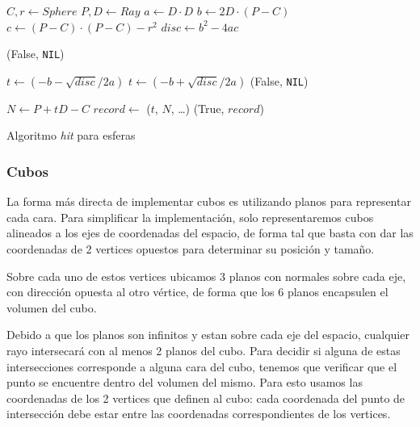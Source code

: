 \begin{algorithm}[H]
\begin{algorithmic}[1]
    \State $C, r \gets Sphere$ 
    \State $P, D \gets Ray$ 
    \State $a \gets D \cdot D$
    \State $b \gets 2D \cdot (P - C)$
    \State $c \gets (P - C) \cdot (P - C) - r^2$
    \State $disc \gets b^2 - 4ac$

        \State \Return (False, \texttt{NIL})
    \EndIf

    \State $t \gets (-b - \sqrt{disc} / 2a)$
        \State $t \gets (-b + \sqrt{disc} / 2a)$
            \State \Return (False, \texttt{NIL})
        \EndIf
    \EndIf

    \State $N \gets P + tD - C$ 
    \State $record \gets$ ($t$, $N$, \dots) 
    \State \Return (True, $record$)
\EndFunction
\end{algorithmic}
\caption{Algoritmo \textit{hit} para esferas}
\label{alg:sphere-hit}
\end{algorithm}

\subsubsection{Cubos}

La forma más directa de implementar cubos es utilizando planos para representar
cada cara. Para simplificar la implementación, solo representaremos cubos
alineados a los ejes de coordenadas del espacio, de forma tal que basta con dar
las coordenadas de 2 vertices opuestos para determinar su posición y tamaño.

Sobre cada uno de estos vertices ubicamos 3 planos con normales sobre cada eje,
con dirección opuesta al otro vértice, de forma que los 6 planos encapsulen el
volumen del cubo.


Debido a que los planos son infinitos y estan sobre cada eje del espacio,
cualquier rayo intersecará con al menos 2 planos del cubo. Para decidir si
alguna de estas intersecciones corresponde a alguna cara del cubo, tenemos que
verificar que el punto se encuentre dentro del volumen del mismo. Para esto
usamos las coordenadas de los 2 vertices que definen al cubo: cada coordenada
del punto de intersección debe estar entre las coordenadas correspondientes de
los vertices.

